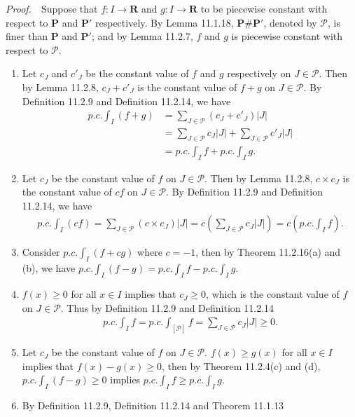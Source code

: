 \documentclass{book}
\newcommand{\pff}{\vspace{.25em}\noindent\emph{Proof.}~~}
\begin{document}
\pff Suppose that $f:I\to\mathbf{R}$ and $g:I\to\mathbf{R}$ to be piecewise constant with respect to $\mathbf{P}$ and $\mathbf{P'}$ respectively. By Lemma 11.1.18, $\mathbf{P}\#\mathbf{P'}$, denoted by $\mathcal{P}$, is finer than $\mathbf{P}$ and $\mathbf{P'}$; and by Lemma 11.2.7, $f$ and $g$ is piecewise constant with respect to $\mathcal{P}$.
\begin{enumerate}
    \item Let $c_{J}$ and $c'_J$ be the constant value of $f$ and $g$ respectively on $J\in\mathcal{P}$. Then by Lemma 11.2.8, $c_J+c'_J$ is the constant value of $f+g$ on $J\in\mathcal{P}$. By Definition 11.2.9 and Definition 11.2.14, we have
        \begin{align*}
            p.c.\int_{I}(f+g)
            &=\sum_{J\in\mathcal{P}}(c_J+c'_J)|J|\\
            &=\sum_{J\in\mathcal{P}}c_J|J|+\sum_{J\in\mathcal{P}}c'_J|J|\\
            &=p.c.\int_{I}f+p.c.\int_{I}g.
        \end{align*}
    \item Let $c_J$ be the constant value of $f$ on $J\in\mathcal{P}$. Then by Lemma 11.2.8, $c\times c_J$ is the constant value of $cf$ on $J\in\mathcal{P}$. By Definition 11.2.9 and Definition 11.2.14, we have
        \begin{align*}
            p.c.\int_{I}(cf)
            =\sum_{J\in\mathcal{P}}(c\times c_J)|J|
            =c\left(\sum_{J\in\mathcal{P}}c_J|J|\right)
            =c\left(p.c.\int_{I}f\right).
        \end{align*}
    \item Consider $p.c.\int_{I}(f+cg)$ where $c=-1$, then by Theorem 11.2.16(a) and (b), we have $p.c.\int_{I}(f-g)=p.c.\int_{I}f-p.c.\int_{I}g$.
    \item $f(x)\geq 0$ for all $x\in I$ implies that $c_J\geq 0$, which is the constant value of $f$ on $J\in\mathcal{P}$. Thus by Definition 11.2.9 and Definition 11.2.14
        \begin{align*}
            p.c.\int_{I}f
            =p.c.\int_{[\mathcal{P}]}f
            =\sum_{J\in\mathcal{P}}c_J|J|\geq 0.
        \end{align*}
    \item Let $c_J$ be the constant value of $f$ on $J\in\mathcal{P}$. $f(x)\geq g(x)$ for all $x\in I$ implies that $f(x)-g(x)\geq 0$, then by Theorem 11.2.4(c) and (d), $p.c.\int_{I}(f-g)\geq 0$ implies $p.c.\int_{I}f\geq p.c.\int_{I}g$.
    \item By Definition 11.2.9, Definition 11.2.14 and Theorem 11.1.13

\end{enumerate}
\end{document}
